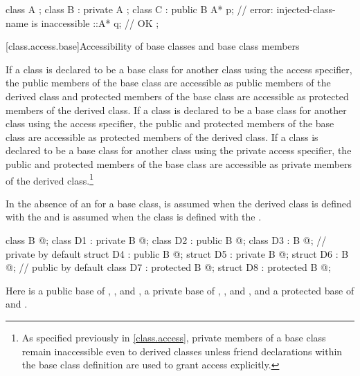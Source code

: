 \begin{example}
\begin{codeblock}
class A { };
class B : private A { };
class C : public B {
  A* p;             // error: injected-class-name  is inaccessible
  ::A* q;           // OK
};
\end{codeblock}
\end{example}

[class.access.base]{Accessibility of base classes and base class members}%
%
%
%
%

\pnum
If a class is declared to be a base class for another class using the
access specifier, the
public members of the base class are accessible as
public members of the derived class and
protected members of the base class are accessible as
protected members of the derived class.
If a class is declared to be a base class for another class using the
access specifier, the
public and protected members of the base class are accessible as
protected members of the derived class.
If a class is declared to be a base class for another class using the
private
access specifier, the
public and protected
members of the base class are accessible as private
members of the derived class.\footnote{As specified previously in \ref{class.access},
private members of a base class remain inaccessible even to derived classes
unless friend
declarations within the base class definition are used to grant access explicitly.}

\pnum
In the absence of an
for a base class,
is assumed when the derived class is
defined with the 
and
is assumed when the class is
defined with the 
.
\begin{example}
\begin{codeblock}
class B { @\commentellip@ };
class D1 : private B { @\commentellip@ };
class D2 : public B { @\commentellip@ };
class D3 : B { @\commentellip@ };             //  private by default
struct D4 : public B { @\commentellip@ };
struct D5 : private B { @\commentellip@ };
struct D6 : B { @\commentellip@ };            //  public by default
class D7 : protected B { @\commentellip@ };
struct D8 : protected B { @\commentellip@ };
\end{codeblock}

Here
is a public base of
,
,
and
,
a private base of
,
,
and
,
and a protected base of
and
.
\end{example}

